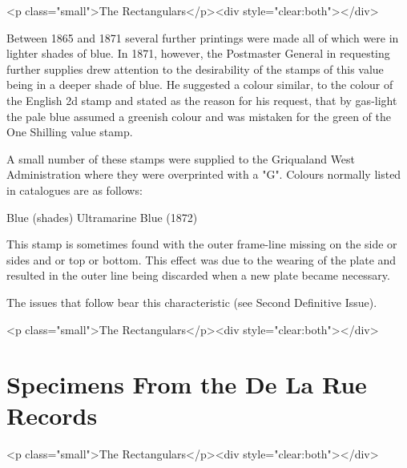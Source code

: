<p class="small">The Rectangulars</p><div style="clear:both"></div>


Between 1865 and 1871 several further printings were 
made all of which were in lighter shades of blue. In 1871, 
however, the Postmaster General in requesting further supplies 
drew attention to the desirability of the stamps of this value 
being in a deeper shade of blue. He suggested a colour similar, 
to the colour of the English 2d stamp and stated as the reason 
for his request, that by gas-light the pale blue assumed a 
greenish colour and was mistaken for the green of the 
One Shilling value stamp.

 

A small number of these stamps were supplied to the Griqualand West 
Administration where they were overprinted with a "G".
Colours normally listed in catalogues are as follows:

Blue (shades)
Ultramarine
Blue (1872)

This stamp is sometimes found with the outer frame-line 
missing on the side or sides and or top or bottom. This effect 
was due to the wearing of the plate and resulted in the outer line 
being discarded when a new plate became necessary.

The issues that follow bear this characteristic (see Second Definitive Issue).

 
<p class="small">The Rectangulars</p><div style="clear:both"></div>

 
\section{Specimens From the De La Rue Records}

<p class="small">The Rectangulars</p><div style="clear:both"></div>



                                                              